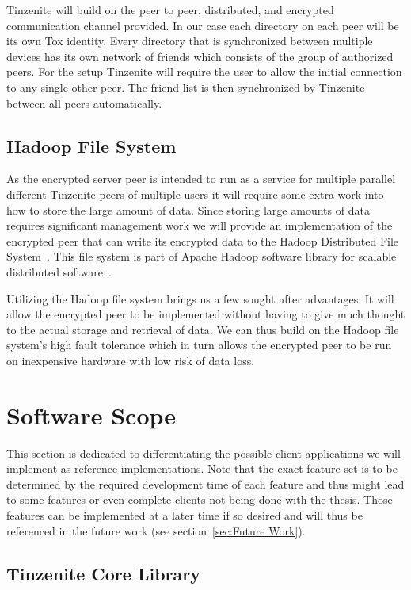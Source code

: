 Tinzenite will build on the peer to peer, distributed, and encrypted communication channel provided.
In our case each directory on each peer will be its own Tox identity.
Every directory that is synchronized between multiple devices has its own network of friends which consists of the group of authorized peers.
For the setup Tinzenite will require the user to allow the initial connection to any single other peer.
The friend list is then synchronized by Tinzenite between all peers automatically.

\subsection{Hadoop File System}
\label{sub:Hadoop File System}

As the encrypted server peer is intended to run as a service for multiple parallel different Tinzenite peers of multiple users it will require some extra work into how to store the large amount of data.
Since storing large amounts of data requires significant management work we will provide an implementation of the encrypted peer that can write its encrypted data to the Hadoop Distributed File System~\cite{borthakur2007hadoop}.
This file system is part of Apache Hadoop software library for scalable distributed software~\cite{web:site:hadoop}.

Utilizing the Hadoop file system brings us a few sought after advantages.
It will allow the encrypted peer to be implemented without having to give much thought to the actual storage and retrieval of data.
We can thus build on the Hadoop file system's high fault tolerance which in turn allows the encrypted peer to be run on inexpensive hardware with low risk of data loss.

\section{Software Scope}
\label{sec:Software Scope}

This section is dedicated to differentiating the possible client applications we will implement as reference implementations.
Note that the exact feature set is to be determined by the required development time of each feature and thus might lead to some features or even complete clients not being done with the thesis.
Those features can be implemented at a later time if so desired and will thus be referenced in the future work (see section~\ref{sec:Future Work}).

\subsection{Tinzenite Core Library}

